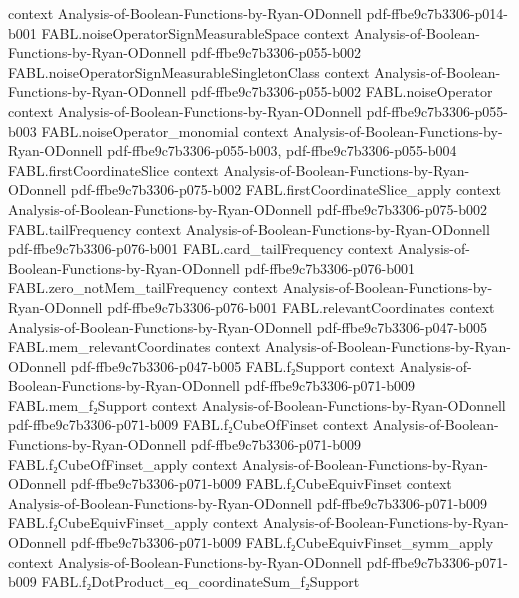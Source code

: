 \begin{theorem}
  {context}
  {Analysis-of-Boolean-Functions-by-Ryan-ODonnell}
  {pdf-ffbe9c7b3306-p014-b001}
\proofstep
  {FABL.noiseOperatorSignMeasurableSpace}
  {context}
  {Analysis-of-Boolean-Functions-by-Ryan-ODonnell}
  {pdf-ffbe9c7b3306-p055-b002}
\proofstep
  {FABL.noiseOperatorSignMeasurableSingletonClass}
  {context}
  {Analysis-of-Boolean-Functions-by-Ryan-ODonnell}
  {pdf-ffbe9c7b3306-p055-b002}
\proofstep
  {FABL.noiseOperator}
  {context}
  {Analysis-of-Boolean-Functions-by-Ryan-ODonnell}
  {pdf-ffbe9c7b3306-p055-b003}
\proofstep
  {FABL.noiseOperator_monomial}
  {context}
  {Analysis-of-Boolean-Functions-by-Ryan-ODonnell}
  {pdf-ffbe9c7b3306-p055-b003,
    pdf-ffbe9c7b3306-p055-b004}
\proofstep
  {FABL.firstCoordinateSlice}
  {context}
  {Analysis-of-Boolean-Functions-by-Ryan-ODonnell}
  {pdf-ffbe9c7b3306-p075-b002}
\proofstep
  {FABL.firstCoordinateSlice_apply}
  {context}
  {Analysis-of-Boolean-Functions-by-Ryan-ODonnell}
  {pdf-ffbe9c7b3306-p075-b002}
\proofstep
  {FABL.tailFrequency}
  {context}
  {Analysis-of-Boolean-Functions-by-Ryan-ODonnell}
  {pdf-ffbe9c7b3306-p076-b001}
\proofstep
  {FABL.card_tailFrequency}
  {context}
  {Analysis-of-Boolean-Functions-by-Ryan-ODonnell}
  {pdf-ffbe9c7b3306-p076-b001}
\proofstep
  {FABL.zero_notMem_tailFrequency}
  {context}
  {Analysis-of-Boolean-Functions-by-Ryan-ODonnell}
  {pdf-ffbe9c7b3306-p076-b001}
\proofstep
  {FABL.relevantCoordinates}
  {context}
  {Analysis-of-Boolean-Functions-by-Ryan-ODonnell}
  {pdf-ffbe9c7b3306-p047-b005}
\proofstep
  {FABL.mem_relevantCoordinates}
  {context}
  {Analysis-of-Boolean-Functions-by-Ryan-ODonnell}
  {pdf-ffbe9c7b3306-p047-b005}
\proofstep
  {FABL.f₂Support}
  {context}
  {Analysis-of-Boolean-Functions-by-Ryan-ODonnell}
  {pdf-ffbe9c7b3306-p071-b009}
\proofstep
  {FABL.mem_f₂Support}
  {context}
  {Analysis-of-Boolean-Functions-by-Ryan-ODonnell}
  {pdf-ffbe9c7b3306-p071-b009}
\proofstep
  {FABL.f₂CubeOfFinset}
  {context}
  {Analysis-of-Boolean-Functions-by-Ryan-ODonnell}
  {pdf-ffbe9c7b3306-p071-b009}
\proofstep
  {FABL.f₂CubeOfFinset_apply}
  {context}
  {Analysis-of-Boolean-Functions-by-Ryan-ODonnell}
  {pdf-ffbe9c7b3306-p071-b009}
\proofstep
  {FABL.f₂CubeEquivFinset}
  {context}
  {Analysis-of-Boolean-Functions-by-Ryan-ODonnell}
  {pdf-ffbe9c7b3306-p071-b009}
\proofstep
  {FABL.f₂CubeEquivFinset_apply}
  {context}
  {Analysis-of-Boolean-Functions-by-Ryan-ODonnell}
  {pdf-ffbe9c7b3306-p071-b009}
\proofstep
  {FABL.f₂CubeEquivFinset_symm_apply}
  {context}
  {Analysis-of-Boolean-Functions-by-Ryan-ODonnell}
  {pdf-ffbe9c7b3306-p071-b009}
\proofstep
  {FABL.f₂DotProduct_eq_coordinateSum_f₂Support}

\end{theorem}
